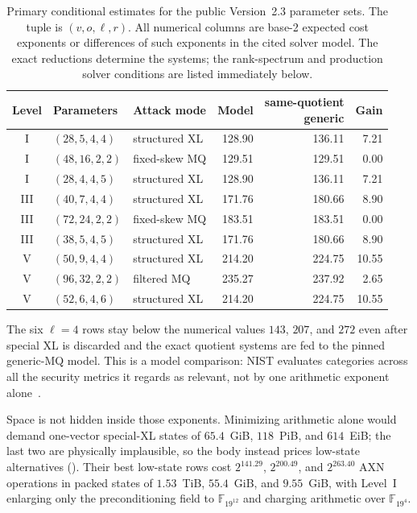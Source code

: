 \documentclass[11pt]{article}
\newcommand{\F}{\mathbb F}
\begin{document}
\begin{table}[H]
\centering
\caption{Primary conditional estimates for the public Version~2.3 parameter
sets.  The tuple is $(v,o,\ell,r)$.  All numerical columns are base-2 expected
cost exponents or differences of such exponents in the cited solver model.
The exact reductions determine the systems; the rank-spectrum and production
solver conditions are listed immediately below.}
\label{tab:main}
\footnotesize
\setlength{\tabcolsep}{3.2pt}
\renewcommand{\arraystretch}{1.08}
\begin{tabular}{@{}c l l r r r@{}}
\toprule
Level & Parameters & Attack mode & Model & \shortstack{same-quotient\\generic} & Gain\\
\midrule
I   & $(28,5,4,4)$  & structured XL & 128.90 & 136.11 &  7.21\\
I   & $(48,16,2,2)$ & fixed-skew MQ & 129.51 & 129.51 &  0.00\\
I   & $(28,4,4,5)$  & structured XL & 128.90 & 136.11 &  7.21\\
\midrule
III & $(40,7,4,4)$  & structured XL & 171.76 & 180.66 &  8.90\\
III & $(72,24,2,2)$ & fixed-skew MQ & 183.51 & 183.51 &  0.00\\
III & $(38,5,4,5)$  & structured XL & 171.76 & 180.66 &  8.90\\
\midrule
V   & $(50,9,4,4)$  & structured XL & 214.20 & 224.75 & 10.55\\
V   & $(96,32,2,2)$ & filtered MQ   & 235.27 & 237.92 &  2.65\\
V   & $(52,6,4,6)$  & structured XL & 214.20 & 224.75 & 10.55\\
\bottomrule
\end{tabular}
\end{table}

The six $\ell=4$ rows stay below the numerical values $143$, $207$, and
$272$ even after special XL is discarded and the exact quotient systems are
fed to the pinned generic-MQ model.  This is a model comparison: NIST evaluates
categories across all the security metrics it regards as relevant, not by one
arithmetic exponent alone~\cite{NISTPQCCriteria}.

Space is not hidden inside those exponents.  Minimizing arithmetic alone would
demand one-vector special-XL states of $65.4$~GiB, $118$~PiB, and $614$~EiB;
the last two are physically implausible, so the body instead prices low-state
alternatives ().  Their best low-state
rows cost $2^{141.29}$, $2^{200.49}$, and $2^{263.40}$ AXN operations in packed
states of $1.53$~TiB, $55.4$~GiB, and $9.55$~GiB, with Level~I enlarging only
the preconditioning field to $\F_{19^{12}}$ and charging arithmetic over
$\F_{19^4}$.
\end{document}
